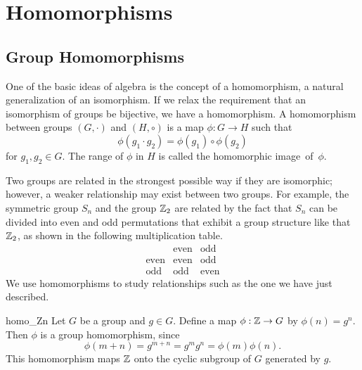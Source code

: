 \chapter{Homomorphisms}\label{homomorph}

 
\section{Group Homomorphisms}
 
 
One of the basic ideas of algebra is the concept of a homomorphism, a
natural generalization of an isomorphism. If we relax the requirement
that an isomorphism of groups be bijective, we have a homomorphism.  A
{\bfi homomorphism\/} between groups $(G, \cdot)$ and $(H, \circ)$ is a map $\phi :
G \rightarrow H$ such that  
$$
\phi( g_1 \cdot g_2 ) = \phi( g_1 ) \circ \phi( g_2 )
$$
for $g_1, g_2 \in G$. The range of $\phi$ in $H$ is called the {\bfi
homomorphic image\/}~of~$\phi$.
 
 
Two groups are related in the strongest possible way if they are
isomorphic; however, a weaker relationship may exist between two
groups.  For example, the symmetric group $S_n$ and the group ${\Bbb
Z}_2$ are related by the fact that $S_n$ can be divided into even and
odd permutations that exhibit a group structure like that ${\Bbb
Z}_2$, as shown in the following multiplication table. 
$$
\begin{array}{c|cc}
            & \mbox{even} & \mbox{odd} \\
\hline
\mbox{even} & \mbox{even} & \mbox{odd} \\
\mbox{odd}  & \mbox{odd}  & \mbox{even}
\end{array}
$$
We use homomorphisms to study relationships such as the one we have
just described.
 
 
\begin{example}{homo_Zn}
Let $G$ be a group and $g \in G$. Define a map $\phi : {\Bbb Z}
\rightarrow G$ by $\phi( n ) = g^n$. Then $\phi$ is a group
homomorphism, since 
$$
\phi( m + n ) = g^{ m + n} = g^m g^n = \phi( m ) \phi( n ).
$$
This homomorphism maps ${\Bbb Z}$ onto the cyclic subgroup of $G$
generated by $g$. 
\mbox{\hspace*{1in}}
\end{example}
 
